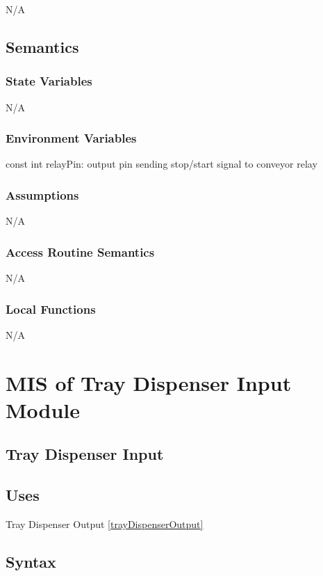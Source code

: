 \documentclass[12pt, titlepage]{article}
\begin{document}
N/A

\subsection{Semantics}

\subsubsection{State Variables}

N/A

\subsubsection{Environment Variables}

const int relayPin: output pin sending stop/start signal to conveyor relay\\

\subsubsection{Assumptions}

N/A

\subsubsection{Access Routine Semantics}

N/A


\subsubsection{Local Functions}

N/A

\section{MIS of Tray Dispenser Input Module} \label{trayDispenserInput} 


\subsection{Tray Dispenser Input}

\subsection{Uses}
Tray Dispenser Output \ref{trayDispenserOutput}

\subsection{Syntax}
\end{document}
